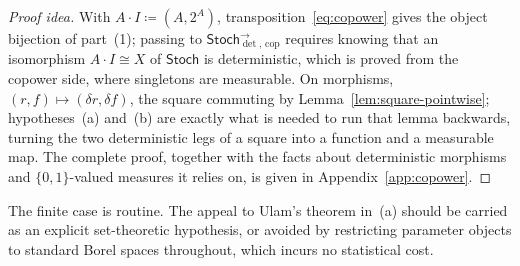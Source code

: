 \documentclass[11pt,a4paper]{article}
\theoremstyle{plain}
\theoremstyle{definition}
\theoremstyle{remark}
\newcommand{\cat}[1]{\mathsf{#1}}
\newcommand{\Stoch}{\cat{Stoch}}
\newcommand{\del}{\delta}
\newcommand{\Arrcop}[1]{#1^{\rightarrow}_{\det,\,\mathrm{cop}}}
\begin{document}
\begin{proof}[Proof idea]
With $A \cdot I \coloneqq (A, 2^{A})$, transposition~\eqref{eq:copower} gives
the object bijection of part~(1); passing to
$\Arrcop{\Stoch}$ requires knowing that an isomorphism
$A \cdot I \cong X$ of $\Stoch$ is deterministic, which is proved from the
copower side, where singletons are measurable. On morphisms,
$(r,f) \mapsto (\del r, \del f)$, the square commuting by
Lemma~\ref{lem:square-pointwise}; hypotheses~(a) and~(b) are exactly what is
needed to run that lemma backwards, turning the two deterministic legs of a
square into a function and a measurable map. The complete proof, together
with the facts about deterministic morphisms and $\{0,1\}$-valued measures it
relies on, is given in Appendix~\ref{app:copower}.
\end{proof}

The finite case is routine. The appeal to Ulam's theorem in~(a) should be
carried as an
explicit set-theoretic hypothesis, or avoided by restricting parameter objects
to standard Borel spaces throughout, which incurs no statistical cost.
\end{document}
